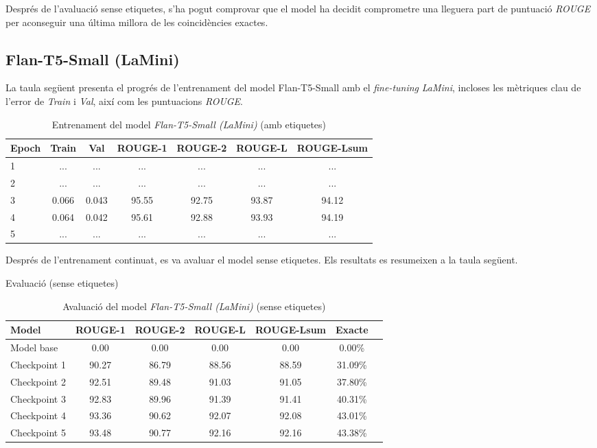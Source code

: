 Després	de l'avaluació sense etiquetes, s'ha pogut comprovar que el model ha decidit comprometre una lleguera part de puntuació \textit{ROUGE} per aconseguir una última millora de les coincidències exactes.



\subsection{Flan-T5-Small (LaMini)}
La taula següent presenta el progrés de l'entrenament del model Flan-T5-Small amb el \textit{fine-tuning} \textit{LaMini}, incloses les mètriques clau de l'error de \textit{Train} i \textit{Val}, així com les puntuacions \textit{ROUGE}.
\begin{table}[H]
    \centering
    \begin{tabular}{lcccccc}
    \toprule
    Epoch & Train & Val & ROUGE-1 & ROUGE-2 & ROUGE-L & ROUGE-Lsum \\
    \midrule
    1 & ... & ... & ... & ... & ... & ... \\
    2 & ... & ... & ... & ... & ... & ... \\
    3 & 0.066 & 0.043 & 95.55 & 92.75 & 93.87 & 94.12 \\
    4 & 0.064 & 0.042 & 95.61 & 92.88 & 93.93 & 94.19 \\
    5 & ... & ... & ... & ... & ... & ... \\
    \bottomrule
    \end{tabular}
    \caption[Entrenament del model \textit{Flan-T5-Small (LaMini)}]{Entrenament del model \textit{Flan-T5-Small (LaMini)} (amb etiquetes)}
\end{table}

Després de l'entrenament continuat, es va avaluar el model sense etiquetes. Els resultats es resumeixen a la taula següent.

\begin{table}[H]
    \centering
    \caption{Evaluació (sense etiquetes)}
    \begin{tabular}{lcccccc}
    \toprule
    Model & ROUGE-1 & ROUGE-2 & ROUGE-L & ROUGE-Lsum & Exacte \\
    \midrule
    Model base   & 0.00  & 0.00  & 0.00  & 0.00  & 0.00\% \\
    Checkpoint 1 & 90.27 & 86.79 & 88.56 & 88.59 & 31.09\% \\
    Checkpoint 2 & 92.51 & 89.48 & 91.03 & 91.05 & 37.80\% \\
    Checkpoint 3 & 92.83 & 89.96 & 91.39 & 91.41 & 40.31\% \\
    Checkpoint 4 & 93.36 & 90.62 & 92.07 & 92.08 & 43.01\% \\
    Checkpoint 5 & 93.48 & 90.77 & 92.16 & 92.16 & 43.38\% \\
    \bottomrule
    \end{tabular}
    \caption[Avaluació del model \textit{Flan-T5-Small (LaMini)}]{Avaluació del model \textit{Flan-T5-Small (LaMini)} (sense etiquetes)}
\end{table}

